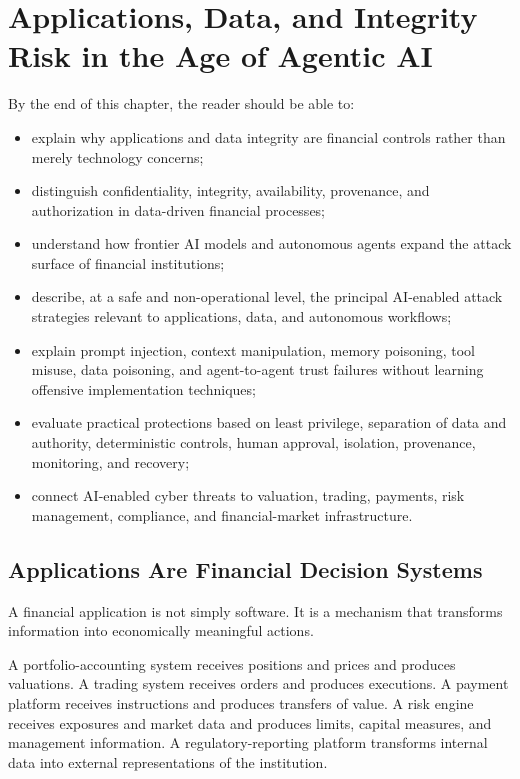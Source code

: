 \chapter{Applications, Data, and Integrity Risk in the Age of Agentic AI}

\begin{learningobjectives}
By the end of this chapter, the reader should be able to:
\begin{itemize}
    \item explain why applications and data integrity are financial controls rather than merely technology concerns;
    \item distinguish confidentiality, integrity, availability, provenance, and authorization in data-driven financial processes;
    \item understand how frontier AI models and autonomous agents expand the attack surface of financial institutions;
    \item describe, at a safe and non-operational level, the principal AI-enabled attack strategies relevant to applications, data, and autonomous workflows;
    \item explain prompt injection, context manipulation, memory poisoning, tool misuse, data poisoning, and agent-to-agent trust failures without learning offensive implementation techniques;
    \item evaluate practical protections based on least privilege, separation of data and authority, deterministic controls, human approval, isolation, provenance, monitoring, and recovery;
    \item connect AI-enabled cyber threats to valuation, trading, payments, risk management, compliance, and financial-market infrastructure.
\end{itemize}
\end{learningobjectives}

\section{Applications Are Financial Decision Systems}

A financial application is not simply software. It is a mechanism that transforms information into economically meaningful actions.

A portfolio-accounting system receives positions and prices and produces valuations. A trading system receives orders and produces executions. A payment platform receives instructions and produces transfers of value. A risk engine receives exposures and market data and produces limits, capital measures, and management information. A regulatory-reporting platform transforms internal data into external representations of the institution.

